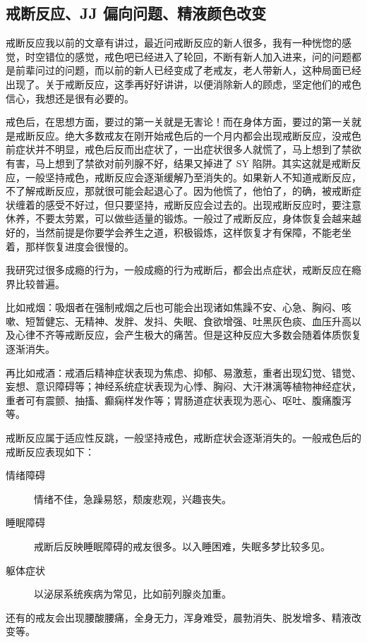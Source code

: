\documentclass{ctexart}
\begin{document}
\subsection{戒断反应、JJ 偏向问题、精液颜色改变}

戒断反应我以前的文章有讲过，最近问戒断反应的新人很多，我有一种恍惚的感觉，时空错位的感觉，戒色吧已经进入了轮回，不断有新人加入进来，问的问题都是前辈问过的问题，而以前的新人已经变成了老戒友，老人带新人，这种局面已经出现了。关于戒断反应，这季再好好讲讲，以便消除新人的顾虑，坚定他们的戒色信心，我想还是很有必要的。

戒色后，在思想方面，要过的第一关就是无害论！而在身体方面，要过的第一关就是戒断反应。绝大多数戒友在刚开始戒色后的一个月内都会出现戒断反应，没戒色前症状并不明显，戒色后反而出症状了，一出症状很多人就慌了，马上想到了禁欲有害，马上想到了禁欲对前列腺不好，结果又掉进了 SY 陷阱。其实这就是戒断反应，一般坚持戒色，戒断反应会逐渐缓解乃至消失的。如果新人不知道戒断反应，不了解戒断反应，那就很可能会起退心了。因为他慌了，他怕了，的确，被戒断症状缠着的感受不好过，但只要坚持，戒断反应会过去的。出现戒断反应时，要注意休养，不要太劳累，可以做些适量的锻炼。一般过了戒断反应，身体恢复会越来越好的，当然前提是你要学会养生之道，积极锻炼，这样恢复才有保障，不能老坐着，那样恢复进度会很慢的。

我研究过很多成瘾的行为，一般成瘾的行为戒断后，都会出点症状，戒断反应在瘾界比较普遍。

比如戒烟：吸烟者在强制戒烟之后也可能会出现诸如焦躁不安、心急、胸闷、咳嗽、短暂健忘、无精神、发胖、发抖、失眠、食欲增强、吐黑灰色痰、血压升高以及心律不齐等戒断反应，会产生极大的痛苦。但是这种反应大多数会随着体质恢复逐渐消失。

再比如戒酒：戒酒后精神症状表现为焦虑、抑郁、易激惹，重者出现幻觉、错觉、妄想、意识障碍等；神经系统症状表现为心悸、胸闷、大汗淋漓等植物神经症状，重者可有震颤、抽搐、癫痫样发作等；胃肠道症状表现为恶心、呕吐、腹痛腹泻等。

戒断反应属于适应性反跳，一般坚持戒色，戒断症状会逐渐消失的。一般戒色后的戒断反应表现如下：

\begin{description}
    \item[情绪障碍] 情绪不佳，急躁易怒，颓废悲观，兴趣丧失。
    \item[睡眠障碍] 戒断后反映睡眠障碍的戒友很多。以入睡困难，失眠多梦比较多见。
    \item[躯体症状] 以泌尿系统疾病为常见，比如前列腺炎加重。
\end{description}

还有的戒友会出现腰酸腰痛，全身无力，浑身难受，晨勃消失、脱发增多、精液改变等。
\end{document}
